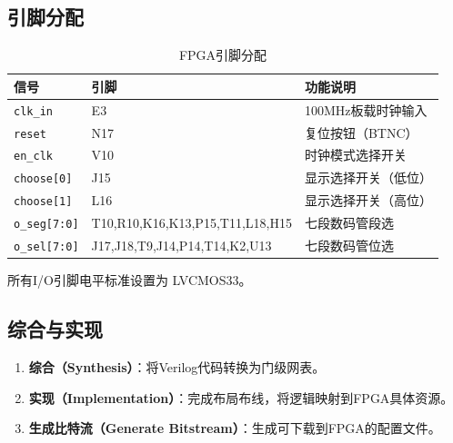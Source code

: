 \subsection{引脚分配}

\begin{table}[H]
    \centering
    \caption{FPGA引脚分配}
    \begin{tabular}{lll}
        \toprule
        \textbf{信号} & \textbf{引脚} & \textbf{功能说明} \\
        \midrule
        \texttt{clk\_in} & E3 & 100MHz板载时钟输入 \\
        \texttt{reset} & N17 & 复位按钮（BTNC） \\
        \texttt{en\_clk} & V10 & 时钟模式选择开关 \\
        \texttt{choose[0]} & J15 & 显示选择开关（低位） \\
        \texttt{choose[1]} & L16 & 显示选择开关（高位） \\
        \texttt{o\_seg[7:0]} & T10,R10,K16,K13,P15,T11,L18,H15 & 七段数码管段选 \\
        \texttt{o\_sel[7:0]} & J17,J18,T9,J14,P14,T14,K2,U13 & 七段数码管位选 \\
        \bottomrule
    \end{tabular}
\end{table}

所有I/O引脚电平标准设置为 LVCMOS33。

\subsection{综合与实现}

\begin{enumerate}[leftmargin=2em]
    \item \textbf{综合（Synthesis）}：将Verilog代码转换为门级网表。
    \item \textbf{实现（Implementation）}：完成布局布线，将逻辑映射到FPGA具体资源。
    \item \textbf{生成比特流（Generate Bitstream）}：生成可下载到FPGA的配置文件。
\end{enumerate}


